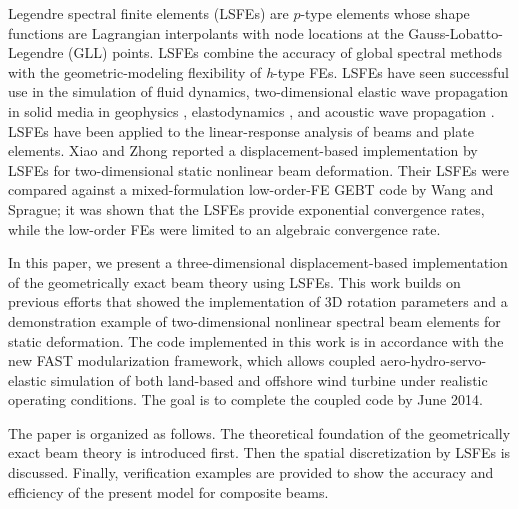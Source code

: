 Legendre spectral finite elements\cite{Patera:1984,Ronquist:1987} (LSFEs)
are $p$-type elements whose shape functions are Lagrangian
interpolants with node locations at the Gauss-Lobatto-Legendre (GLL) points.
LSFEs combine the accuracy of global spectral methods with the
geometric-modeling
flexibility of {\it h}-type FEs. LSFEs have seen successful use
in the simulation of fluid dynamics\cite{Ronquist:1987, Patera:1984,
Deville:2002}, two-dimensional elastic wave propagation in solid media in
geophysics \cite{Komatitsch:1998}, elastodynamics \cite{Sridhar:2006}, and
acoustic wave propagation \cite{Sprague:2004}. LSFEs have been applied to
the linear-response analysis of
beams\cite{Ben-Tal-etal:1995,Ben-Tal-etal:1996,Kudela-etal:2007a,Sprague-Geers:2008,Wang:SFE2013}
and plate elements\cite{Zrahia-Bar-Yoseph:1995,
Kudela-etal:2007b,Sprague-Brito:2012}. Xiao and Zhong \cite{Xiao-Zhong:2012} reported  a displacement-based implementation by LSFEs for two-dimensional static nonlinear beam deformation. Their
LSFEs were compared against a mixed-formulation
low-order-FE GEBT code by Wang and
Sprague\cite{Wang:SFE2013};  it was shown that the LSFEs provide
exponential convergence rates, while the low-order FEs were limited to
an algebraic convergence rate.

In this paper, we present a three-dimensional displacement-based
implementation of the geometrically exact beam theory using LSFEs.  This work
builds on previous efforts that showed the implementation of 3D rotation
parameters\cite{Wang:GEBT2013} and a demonstration example of
two-dimensional nonlinear spectral beam elements\cite{Wang:SFE2013} for
static deformation.  The code implemented in this work is in accordance with
the new FAST modularization framework\cite{Jonkman:2013},  which allows coupled aero-hydro-servo-elastic simulation of both land-based and offshore wind turbine under realistic operating conditions. The goal is to complete the coupled code by June 2014.

The paper is organized as follows.  The theoretical foundation of the
geometrically exact beam theory is introduced first. Then the spatial
discretization by LSFEs is discussed. Finally, verification examples are
provided to show the accuracy and efficiency of the present model  for
composite beams.  



